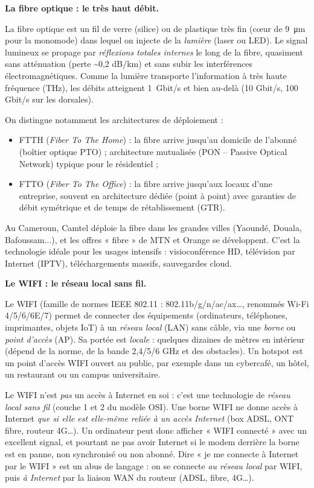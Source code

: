 \documentclass[11pt]{article}
\newcommand{\cle}[1]{{\popxbold\color{popdark}#1}}
\newcounter{popsec}
\newcounter{popsub}
\newcommand{\courssub}[1]{%
  \stepcounter{popsub}%
  \par\vspace{9pt}\noindent{\popxbold\fontsize{11.5}{13}\selectfont\color{popink}{\color{poporange}\thepopsec.\thepopsub}\hspace{6pt}#1}\par\nopagebreak\vspace{4pt}
}
\begin{document}
\textbf{La fibre optique : le très haut débit.}\par
La \cle{fibre optique} est un fil de verre (silice) ou de plastique très fin (cœur de \SI{9}{\micro m} pour la monomode) dans lequel on injecte de la \emph{lumière} (laser ou LED). Le signal lumineux se propage par \emph{réflexions totales internes} le long de la fibre, quasiment sans atténuation (perte \textasciitilde 0,2 dB/km) et sans subir les interférences électromagnétiques. Comme la lumière transporte l'information à très haute fréquence (THz), les débits atteignent \SI{1}{Gbit/s} et bien au-delà (10 Gbit/s, 100 Gbit/s sur les dorsales).

On distingue notamment les architectures de déploiement :
\begin{itemize}
\item \cle{FTTH} (\emph{Fiber To The Home}) : la fibre arrive jusqu'au domicile de l'abonné (boîtier optique PTO) ; architecture mutualisée (PON -- Passive Optical Network) typique pour le résidentiel ;
\item \cle{FTTO} (\emph{Fiber To The Office}) : la fibre arrive jusqu'aux locaux d'une entreprise, souvent en architecture dédiée (point à point) avec garanties de débit symétrique et de temps de rétablissement (GTR).
\end{itemize}

Au Cameroun, Camtel déploie la fibre dans les grandes villes (Yaoundé, Douala, Bafoussam...), et les offres « fibre » de MTN et Orange se développent. C'est la technologie idéale pour les usages intensifs : visioconférence HD, télévision par Internet (IPTV), téléchargements massifs, sauvegardes cloud.

\courssub{Les technologies sans fil}

\textbf{Le WIFI : le réseau local sans fil.}\par
Le \cle{WIFI} (famille de normes \cle{IEEE 802.11} : 802.11b/g/n/ac/ax\ldots, renommés Wi-Fi 4/5/6/6E/7) permet de connecter des équipements (ordinateurs, téléphones, imprimantes, objets IoT) à un \emph{réseau local} (LAN) sans câble, via une \emph{borne} ou \emph{point d'accès} (AP). Sa portée est \emph{locale} : quelques dizaines de mètres en intérieur (dépend de la norme, de la bande 2,4/5/6 GHz et des obstacles). Un \cle{hotspot} est un point d'accès WIFI ouvert au public, par exemple dans un cybercafé, un hôtel, un restaurant ou un campus universitaire.

\begin{attention}
Le WIFI n'est \emph{pas} un accès à Internet en soi : c'est une technologie de \emph{réseau local sans fil} (couche 1 et 2 du modèle OSI). Une borne WIFI ne donne accès à Internet \emph{que si elle est elle-même reliée à un accès Internet} (box ADSL, ONT fibre, routeur 4G\ldots). Un ordinateur peut donc afficher « WIFI connecté » avec un excellent signal, et pourtant ne pas avoir Internet si le modem derrière la borne est en panne, non synchronisé ou non abonné. Dire « je me connecte à Internet par le WIFI » est un abus de langage : on se connecte \emph{au réseau local} par WIFI, puis \emph{à Internet} par la liaison WAN du routeur (ADSL, fibre, 4G\ldots).
\end{attention}
\end{document}
